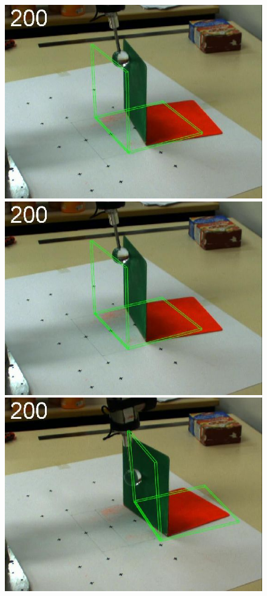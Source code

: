 \begin{figure}[tb]
{\includegraphics[width=\imgBXwid]{images/B2_1exp_58_3}
\includegraphics[width=\imgBXwid]{images/B2_LWPR1_58_3}
\includegraphics[width=\imgBXwid]{images/B2_2exp_38_3}
}


\end{figure}
